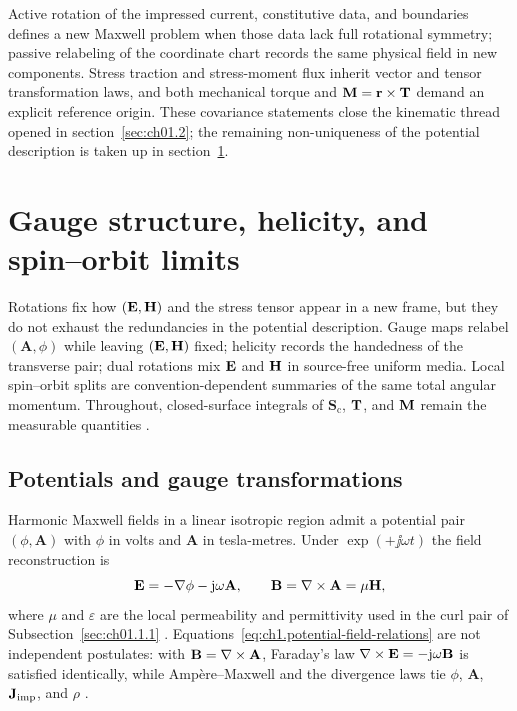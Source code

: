 Active rotation of the impressed current, constitutive data, and boundaries defines a new Maxwell problem when those data lack full rotational symmetry; passive relabeling of the coordinate chart records the same physical field in new components. Stress traction and stress-moment flux inherit vector and tensor transformation laws, and both mechanical torque and $\mathbf{M}=\mathbf{r}\times\mathbf{T}$ demand an explicit reference origin. These covariance statements close the kinematic thread opened in section~\ref{sec:ch01.2}; the remaining non-uniqueness of the potential description is taken up in section~\ref{sec:ch01.4}.

\label{sec:ch01.3.4}

\FloatBarrier
\section{Gauge structure, helicity, and spin--orbit limits}
\label{sec:ch01.4}

Rotations fix how $(\mathbf{E},\mathbf{H})$ and the stress tensor appear in a new frame, but they do not exhaust the redundancies in the potential description. Gauge maps relabel $(\mathbf{A},\phi)$ while leaving $(\mathbf{E},\mathbf{H})$ fixed; helicity records the handedness of the transverse pair; dual rotations mix $\mathbf{E}$ and $\mathbf{H}$ in source-free uniform media. Local spin--orbit splits are convention-dependent summaries of the same total angular momentum. Throughout, closed-surface integrals of $\mathbf{S}_\mathrm{c}$, $\mathbf{T}$, and $\mathbf{M}$ remain the measurable quantities \cite{belinfante1940,jackson1999,stratton1941}.

\label{sec:ch01.4.2}
\label{prin:ch1.angular-em-structure}

\subsection{Potentials and gauge transformations}
\label{sec:ch01.4.1}

Harmonic Maxwell fields in a linear isotropic region admit a potential pair $(\phi,\mathbf{A})$ with $\phi$ in volts and $\mathbf{A}$ in tesla-metres. Under $\exp(+\jj\omega t)$ the field reconstruction is
\begin{equation}
\label{eq:ch1.potential-field-relations}
\mathbf{E}=-\nabla\phi-\mathrm{j}\omega\mathbf{A},\qquad
\mathbf{B}=\nabla\times\mathbf{A}=\mu\mathbf{H},
\end{equation}
where $\mu$ and $\varepsilon$ are the local permeability and permittivity used in the curl pair of Subsection~\ref{sec:ch01.1.1} \cite{stratton1941,jackson1999}. Equations~\eqref{eq:ch1.potential-field-relations} are not independent postulates: with $\mathbf{B}=\nabla\times\mathbf{A}$, Faraday's law $\nabla\times\mathbf{E}=-\mathrm{j}\omega\mathbf{B}$ is satisfied identically, while Amp\`ere--Maxwell and the divergence laws tie $\phi$, $\mathbf{A}$, $\mathbf{J}_{\mathrm{imp}}$, and $\rho$ \cite{stratton1941}.

